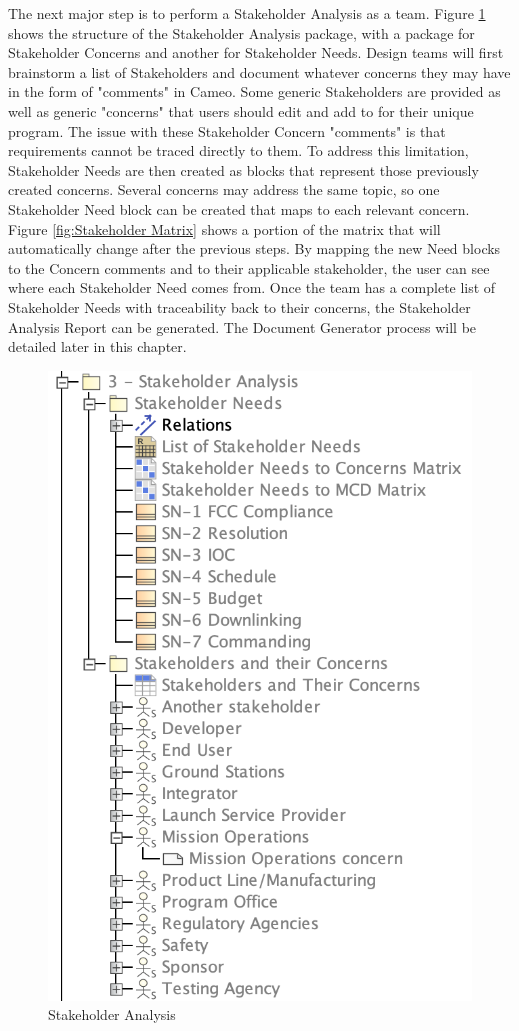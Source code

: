 The next major step is to perform a Stakeholder Analysis as a team. Figure \ref{fig:Stakeholder Analysis} shows the structure of the Stakeholder Analysis package, with a package for Stakeholder Concerns and another for Stakeholder Needs. Design teams will first brainstorm a list of Stakeholders and document whatever concerns they may have in the form of "comments" in Cameo. Some generic Stakeholders are provided as well as generic "concerns" that users should edit and add to for their unique program. The issue with these Stakeholder Concern "comments" is that requirements cannot be traced directly to them. To address this limitation, Stakeholder Needs are then created as blocks that represent those previously created concerns. Several concerns may address the same topic, so one Stakeholder Need block can be created that maps to each relevant concern. Figure \ref{fig:Stakeholder Matrix} shows a portion of the matrix that will automatically change after the previous steps. By mapping the new Need blocks to the Concern comments and to their applicable stakeholder, the user can see where each Stakeholder Need comes from. Once the team has a complete list of Stakeholder Needs with traceability back to their concerns, the Stakeholder Analysis Report can be generated. The Document Generator process will be detailed later in this chapter. 

\begin{figure}[H]
    \centering
    \includegraphics[width=3 in]{Thesis/Analysis_and_Results/Analysis and Results Figures/Stakeholder Containment Tree.png}
    \caption{Stakeholder Analysis}
    \label{fig:Stakeholder Analysis}
\end{figure}

